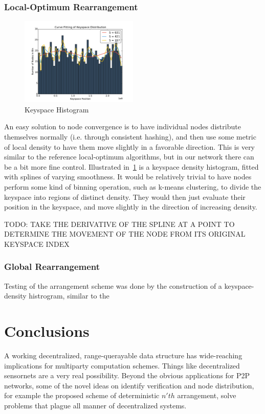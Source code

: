 \documentclass[10pt]{IEEEtran}
\begin{document}
\subsubsection{Local-Optimum Rearrangement}
\begin{figure}
\centering
\includegraphics[width=0.5\textwidth]{plots/histogram}
\caption{Keyspace Histogram}
\label{fig:Histo}
\end{figure}
\par An easy solution to node convergence is to have individual nodes distribute themselves normally (i.e. through consistent hashing), and then use some metric of local density to have them move slightly in a favorable direction. This is very similar to the reference local-optimum algorithms, but in our network there can be a bit more fine control. Illustrated in~\ref{fig:Histo} is a keyspace density histogram, fitted with splines of varying smoothness. It would be relatively trivial to have nodes perform some kind of binning operation, such as k-means clustering, to divide the keyspace into regions of distinct density. They would then just evaluate their position in the keyspace, and move slightly in the direction of increasing density.

\par TODO: TAKE THE DERIVATIVE OF THE SPLINE AT A POINT TO DETERMINE THE MOVEMENT OF THE NODE FROM ITS ORIGINAL KEYSPACE INDEX



\subsubsection{Global Rearrangement}

\par Testing of the arrangement scheme was done by the construction of a keyspace-density histrogram, similar to the 


\section{Conclusions}
\par A working decentralized, range-querayable data structure has wide-reaching implications for multiparty computation schemes. Things like decentralized sensornets are a very real possibility. Beyond the obvious applications for P2P networks, some of the novel ideas on identify verification and node distribution, for example the proposed scheme of deterministic $n'th$ arrangement, solve problems that plague all manner of decentralized systems. 



\printbibliography
\end{document}
